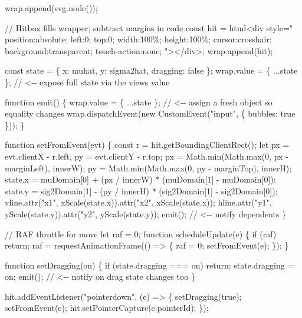 \documentclass[
  letterpaper,
  DIV=11,
  numbers=noendperiod]{scrreprt}
\newenvironment{Shaded}{\begin{snugshade}}{\end{snugshade}}
\newcommand{\NormalTok}[1]{\textcolor[rgb]{0.00,0.23,0.31}{#1}}
\theoremstyle{definition}
\theoremstyle{plain}
\theoremstyle{definition}
\theoremstyle{remark}
\begin{document}
\begin{Shaded}
\begin{Highlighting}[]
\NormalTok{  wrap.append(svg.node());}

\NormalTok{  // Hitbox fills wrapper; subtract margins in code}
\NormalTok{  const hit = html\textasciigrave{}\textless{}div style="}
\NormalTok{    position:absolute; left:0; top:0; width:100\%; height:100\%;}
\NormalTok{    cursor:crosshair; background:transparent; touch{-}action:none;}
\NormalTok{  "\textgreater{}\textless{}/div\textgreater{}\textasciigrave{};}
\NormalTok{  wrap.append(hit);}

\NormalTok{  const state = \{ x: muhat, y: sigma2hat, dragging: false \};}
\NormalTok{  wrap.value = \{ ...state \};            // \textless{}{-}{-} expose full state via the view\textquotesingle{}s value}

\NormalTok{  function emit() \{}
\NormalTok{    wrap.value = \{ ...state \};          // \textless{}{-}{-} assign a fresh object so equality changes}
\NormalTok{    wrap.dispatchEvent(new CustomEvent("input", \{ bubbles: true \}));}
\NormalTok{  \}}

\NormalTok{  function setFromEvent(evt) \{}
\NormalTok{    const r = hit.getBoundingClientRect();}
\NormalTok{    let px = evt.clientX {-} r.left, py = evt.clientY {-} r.top;}
\NormalTok{    px = Math.min(Math.max(0, px {-} marginLeft), innerW);}
\NormalTok{    py = Math.min(Math.max(0, py {-} marginTop), innerH);}
\NormalTok{    state.x = muDomain[0] + (px / innerW) * (muDomain[1] {-} muDomain[0]);}
\NormalTok{    state.y = sig2Domain[1] {-} (py / innerH) * (sig2Domain[1] {-} sig2Domain[0]);}
\NormalTok{    vline.attr("x1", xScale(state.x)).attr("x2", xScale(state.x));}
\NormalTok{    hline.attr("y1", yScale(state.y)).attr("y2", yScale(state.y));}
\NormalTok{    emit();                              // \textless{}{-}{-} notify dependents}
\NormalTok{  \}}

\NormalTok{  // RAF throttle for move}
\NormalTok{  let raf = 0;}
\NormalTok{  function scheduleUpdate(e) \{}
\NormalTok{    if (raf) return;}
\NormalTok{    raf = requestAnimationFrame(() =\textgreater{} \{ raf = 0; setFromEvent(e); \});}
\NormalTok{  \}}

\NormalTok{  function setDragging(on) \{}
\NormalTok{    if (state.dragging === on) return;}
\NormalTok{    state.dragging = on;}
\NormalTok{    emit();                              // \textless{}{-}{-} notify on drag state changes too}
\NormalTok{  \}}

\NormalTok{  hit.addEventListener("pointerdown", (e) =\textgreater{} \{}
\NormalTok{    setDragging(true);}
\NormalTok{    setFromEvent(e);}
\NormalTok{    hit.setPointerCapture(e.pointerId);}
\NormalTok{  \});}


\end{Highlighting}
\end{Shaded}
\end{document}
